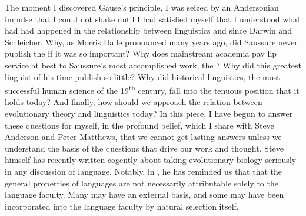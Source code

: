 \documentclass[output=paper,
modfonts
]{LSP/langsci}
\begin{document}
The moment I discovered Gause's principle, I was seized by an Andersonian impulse that I could not shake until I had satisfied myself that I understood what had had happened in the relationship between linguistics and  since Darwin and Schleicher. Why, as Morris Halle pronounced many years ago, did Saussure never publish the  if it was so important?  Why does mainstream academia pay lip service at best to Saussure's most accomplished work, the ?  Why did this greatest linguist of his time publish so little? Why did historical linguistics, the most successful human science of the 19\textsuperscript{th} century, fall into the tenuous position that it holds today? And finally, how should we approach the relation between evolutionary theory and linguistics today?  In this piece, I have begun to answer these questions for myself, in the profound belief, which I share with Steve Anderson and Peter Matthews, that we cannot get lasting answers unless we understand the basis of the questions that drive our work and thought. Steve himself has recently written cogently about taking evolutionary biology seriously in any discussion of language. Notably, in \citet{anderson2013}, he has reminded us that that the general properties of languages are not necessarily attributable solely to the language faculty.  Many may have an external basis, and some may have been incorporated into the language faculty by natural selection itself.

\printbibliography[heading=subbibliography,notkeyword=this]

\end{document}
